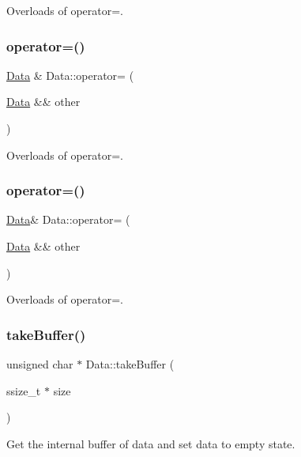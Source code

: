 Overloads of operator=. \mbox{\label{classData_a06a02edb0612660b8339f15d7e99d4d0}} 
\subsubsection{\texorpdfstring{operator=()}{operator=()}\hspace{0.1cm}{\footnotesize\ttfamily [3/4]}}
{\footnotesize\ttfamily \hyperlink{classData}{Data} \& Data\+::operator= (\begin{DoxyParamCaption}\item[{\hyperlink{classData}{Data} \&\&}]{other }\end{DoxyParamCaption})}

Overloads of operator=. \mbox{\label{classData_af4f6ef886b01c278efedd31b0165e463}} 
\subsubsection{\texorpdfstring{operator=()}{operator=()}\hspace{0.1cm}{\footnotesize\ttfamily [4/4]}}
{\footnotesize\ttfamily \hyperlink{classData}{Data}\& Data\+::operator= (\begin{DoxyParamCaption}\item[{\hyperlink{classData}{Data} \&\&}]{other }\end{DoxyParamCaption})}

Overloads of operator=. \mbox{\label{classData_a01e95fc47766e7d4cbfea893e02d0479}} 
\subsubsection{\texorpdfstring{take\+Buffer()}{takeBuffer()}\hspace{0.1cm}{\footnotesize\ttfamily [1/2]}}
{\footnotesize\ttfamily unsigned char $\ast$ Data\+::take\+Buffer (\begin{DoxyParamCaption}\item[{ssize\+\_\+t $\ast$}]{size }\end{DoxyParamCaption})}

Get the internal buffer of data and set data to empty state.

